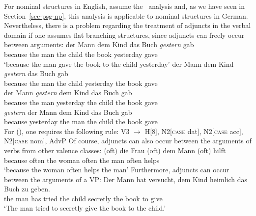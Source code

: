 For nominal structures in English, \citet[]{GKPS85a} assume the \xbar~analysis and, as we have seen in Section~\ref{sec-psg-np}, this analysis is applicable
to nominal structures in German. Nevertheless, there is a problem regarding the treatment of adjuncts in the verbal domain if one assumes flat branching structures, since adjuncts can
freely occur between arguments:
\eal
\ex 
\gll [weil] der Mann dem Kind das Buch \emph{gestern} gab\\
	 \spacebr{}because the man the child the book yesterday gave\\
\glt `because the man gave the book to the child yesterday'
\ex 
\gll [weil] der Mann dem Kind \emph{gestern} das Buch gab\\
	 \spacebr{}because the man the child yesterday the book gave\\
\ex 
\gll [weil] der Mann \emph{gestern} dem Kind das Buch gab\\
	 \spacebr{}because the man yesterday the child the book gave\\
\ex 
\gll [weil] \emph{gestern} der Mann dem Kind das Buch gab\\
	 \spacebr{}because yesterday the man the child the book gave\\
\zl
For (), one requires the following rule:
\ea
\label{regel-ditransitiv-adv}
V3  $\to$ H[8], N2[\textsc{case} dat], N2[\textsc{case} acc], N2[\textsc{case} nom], AdvP
\z
Of course, adjuncts can also occur between the arguments of verbs from other valence classes:
\ea
\gll [weil] (oft) die Frau (oft) dem Mann (oft) hilft\\
     \spacebr{}because \spacebr{}often the woman \spacebr{}often the man \spacebr{}often helps\\
\glt `because the woman often helps the man'
\z
Furthermore, adjuncts can occur between the arguments of a VP:
\ea
\gll Der Mann hat versucht, dem Kind heimlich das Buch zu geben.\\
	the man has tried the child secretly the book to give\\
\glt `The man tried to secretly give the book to the child.'
\z 

